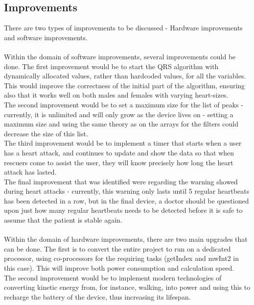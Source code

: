 \documentclass[12pt,a4paper]{article}
\begin{document}
\subsection{Improvements}
	There are two types of improvements to be discussed - Hardware improvements and software improvements.\\
	\\
	Within the domain of software improvements, several improvements could be done. The first improvement would be to start the QRS algorithm with dynamically allocated values, rather than hardcoded values, for all the variables. This would improve the correctness of the initial part of the algorithm, ensuring also that it works well on both males and females with varying heart-sizes.\\
	The second improvement would be to set a maximum size for the list of peaks - currently, it is unlimited and will only grow as the device lives on - setting a maximum size and using the same theory as on the arrays for the filters could decrease the size of this list.\\
	The third improvement would be to implement a timer that starts when a user has a heart attack, and continues to update and show the data so that when rescuers come to assist the user, they will know precisely how long the heart attack has lasted.\\
	The final improvement that was identified were regarding the warning showed during heart attacks - currently, this warning only lasts until 5 regular heartbeats has been detected in a row, but in the final device, a doctor should be questioned upon just how many regular heartbeats needs to be detected before it is safe to assume that the patient is stable again.\\
	\\
	Within the domain of hardware improvements, there are two main upgrades that can be done. The first is to convert the entire project to run on a dedicated processor, using co-processors for the requiring tasks (getIndex and mwInt2 in this case). This will improve both power consumption and calculation speed.\\
	The second improvement would be to implement modern technologies of converting kinetic energy from, for instance, walking, into power and using this to recharge the battery of the device, thus increasing its lifespan.	
\end{document}
